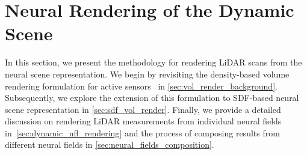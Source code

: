 \section{Neural Rendering of the Dynamic Scene}
In this section, we present the methodology for rendering LiDAR scans from the neural scene representation. We begin by revisiting the density-based volume rendering formulation for active sensors~\cite{Huang2023nfl} in \cref{sec:vol_render_background}. Subsequently, we explore the extension of this formulation to SDF-based neural scene representation in \cref{sec:sdf_vol_render}. Finally, we provide a detailed discussion on rendering LiDAR measurements from individual neural fields in~\cref{sec:dynamic_nfl_rendering} and the process of composing results from different neural fields in \cref{sec:neural_fields_composition}.



